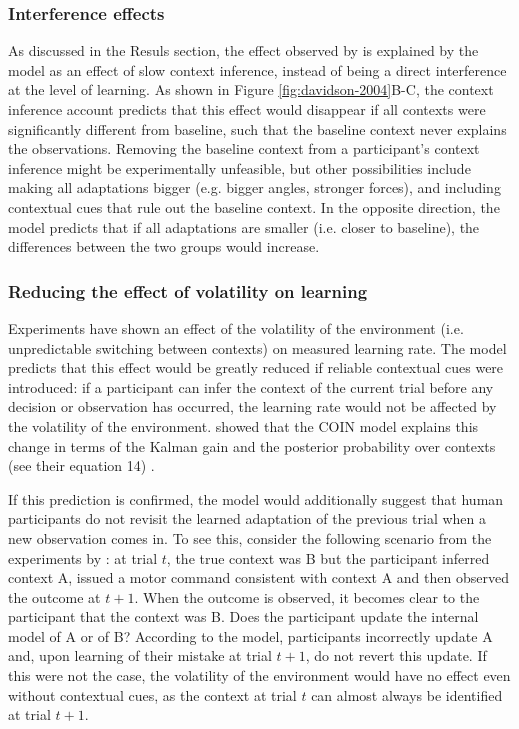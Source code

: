 \documentclass[a4paper,doc,floatsintext,natbib]{apa6}
\def \fref #1{Figure \ref{#1}}     %
\begin{document}
\subsubsection{Interference effects}
As discussed in the Resuls section, the effect observed by \cite{Davidson_Scaling_2004} is explained by the model as an effect of slow context inference, instead of being a direct interference at the level of learning. As shown in \fref{fig:davidson-2004}B-C, the context inference account predicts that this effect would disappear if all contexts were significantly different from baseline, such that the baseline context never explains the observations. Removing the baseline context from a participant's context inference might be experimentally unfeasible, but other possibilities include making all adaptations bigger (e.g. bigger angles, stronger forces), and including contextual cues that rule out the baseline context. In the opposite direction, the model predicts that if all adaptations are smaller (i.e. closer to baseline), the differences between the two groups would increase.

\subsubsection{Reducing the effect of volatility on learning}
Experiments \citep{Herzfeld_memory_2014,Heald_Contextual_2021} have shown an effect of the volatility of the environment (i.e. unpredictable switching between contexts) on measured learning rate. The model predicts that this effect would be greatly reduced if reliable contextual cues were introduced: if a participant can infer the context of the current trial before any decision or observation has occurred, the learning rate would not be affected by the volatility of the environment. \cite{Heald_Contextual_2021} showed that the COIN model explains this change in terms of the Kalman gain and the posterior probability over contexts (see their equation 14) .

If this prediction is confirmed, the model would additionally suggest that human participants do not revisit the learned adaptation of the previous trial when a new observation comes in. To see this, consider the following scenario from the experiments by \cite{Herzfeld_memory_2014}: at trial $t$, the true context was B but the participant inferred context A, issued a motor command consistent with context A and then observed the outcome at $t + 1$. When the outcome is observed, it becomes clear to the participant that the context was B. Does the participant update the internal model of A or of B? According to the model, participants incorrectly update A and, upon learning of their mistake at trial $t+1$, do not revert this update. If this were not the case, the volatility of the environment would have no effect even without contextual cues, as the context at trial $t$ can almost always be identified at trial $t+1$.
\end{document}
